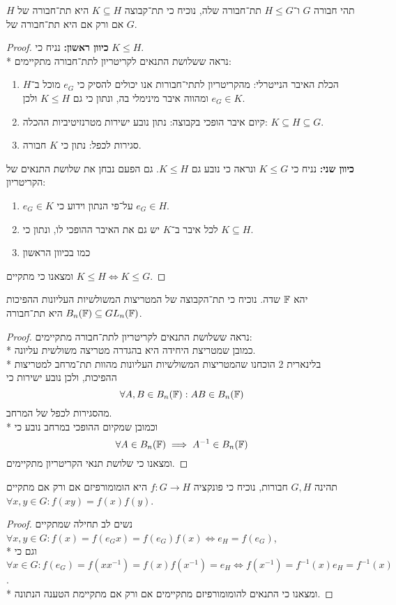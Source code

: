 \Question{}
\Subquestion{}
תהי חבורה $G$ ו־$H \le G$ תת־חבורה שלה, נוכיח כי תת־קבוצה $K \subseteq H$ היא תת־חבורה של $H$ אם ורק אם היא תת־חבורה של $G$.
\begin{proof}
	\textbf{כיוון ראשון:} נניח כי $K \le H$. \\*
	נראה ששלושת התנאים לקריטריון לתת־חבורה מתקיימים:
	\begin{enumerate}
		\item הכלת האיבר הנייטרלי: מהקריטריון לתתי־חבורות אנו יכולים להסיק כי $e_G$ מוכל ב־$H$ ומהווה איבר מינימלי בה, ונתון כי גם $K \le H$ ולכן $e_G \in K$.
		\item קיום איבר הופכי בקבוצה: נתון נובע ישירות מטרנזיטיביות ההכלה: $K \subseteq H \subseteq G$.
		\item סגירות לכפל: נתון כי $K$ חבורה.
	\end{enumerate}
	\textbf{כיוון שני:} נניח כי $K \le G$ ונראה כי נובע גם $K \le H$. גם הפעם נבחן את שלושת התנאים של הקריטריון:
	\begin{enumerate}
		\item $e_G \in K$ על־פי הנתון וידוע כי $e_G \in H$.
		\item לכל איבר ב־$K$ יש גם את האיבר ההופכי לו, ונתון כי $K \subseteq H$.
		\item כמו בכיוון הראשון
	\end{enumerate}
	ומצאנו כי מתקיים $K \le H \iff K \le G$.
\end{proof}

\Subquestion{}
יהא $\mathbb{F}$ שדה. נוכיח כי תת־הקבוצה של המטריצות המשולשיות העליונות ההפיכות $B_n(\mathbb{F}) \subseteq GL_n(\mathbb{F})$ היא תת־חבורה.
\begin{proof}
	נראה ששלושת התנאים לקריטריון לתת־חבורה מתקיימים: \\*
	כמובן שמטריצת היחידה היא בהגדרה מטריצה משולשית עליונה. \\*
	בלינארית 2 הוכחנו שהמטריצות המשולשיות העליונות מהוות תת־מרחב למטריצות ההפיכות, ולכן נובע ישירות כי
	\[
		\forall A, B \in B_n(\mathbb{F}) : AB \in B_n(\mathbb{F})
	\]
	מהסגירות לכפל של המרחב. \\*
	וכמובן שמקיום ההופכי במרחב נובע כי
	\[
		\forall A \in B_n(\mathbb{F}) \implies A^{-1} \in B_n(\mathbb{F})
	\]
	ומצאנו כי שלושת תנאי הקריטריון מתקיימים.
\end{proof}

\Question{}
\Subquestion{}
תהינה $G, H$ חבורות, נוכיח כי פונקציה $f : G \to H$ היא הומומורפיזם אם ורק אם מתקיים $\forall x, y \in G : f(xy) = f(x)f(y)$.
\begin{proof}
	נשים לב תחילה שמתקיים $\forall x, y \in G : f(x) = f(e_G x) = f(e_G) f(x) \iff e_H = f(e_G)$, \\*
	וגם כי $\forall x \in G: f(e_G) = f(xx^{-1}) = f(x)f(x^{-1}) = e_H \iff f(x^{-1}) = f^{-1}(x) e_H = f^{-1}(x)$. \\*
	ומצאנו כי התנאים להומומורפיזם מתקיימים אם ורק אם מתקיימת הטענה הנתונה.
\end{proof}

